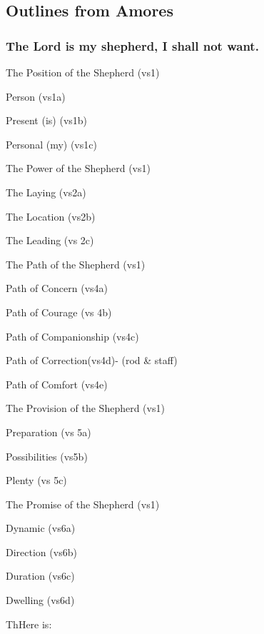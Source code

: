 \subsection{Outlines from Amores}

\subsubsection{The Lord is my shepherd, I shall not want.}


\begin{compactenum}[I.]
    \item The Position of the Shepherd (vs1)
    \begin{compactenum}[A.]
        \item Person (vs1a)
        \item Present (is) (vs1b)
        \item Personal (my) (vs1c)
    \end{compactenum}
    \item The Power of the Shepherd (vs1)
    \begin{compactenum}[A.]
        \item The Laying (vs2a)
        \item The Location (vs2b)
        \item The Leading (vs 2c) 
    \end{compactenum}
    \item The Path of the Shepherd (vs1)
    \begin{compactenum}[A.]
        \item Path of Concern (vs4a)
        \item Path of Courage (vs 4b)
        \item Path of Companionship (vs4c)
        \item Path of Correction(vs4d)- (rod \& staff)
        \item Path of Comfort (vs4e)
    \end{compactenum}
    \item The Provision of the Shepherd (vs1)
    \begin{compactenum}[A.]
        \item Preparation (vs 5a)
        \item Possibilities (vs5b)
        \item Plenty (vs 5c)
    \end{compactenum}
    \item The Promise of the Shepherd (vs1)
    \begin{compactenum}[A.]
        \item Dynamic (vs6a)
        \item Direction (vs6b)
        \item Duration (vs6c)
        \item Dwelling (vs6d)\\
    \end{compactenum}
\end{compactenum}ThHere is:
